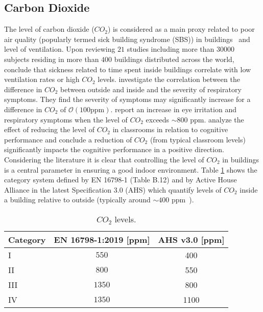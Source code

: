 \documentclass[fleqn,usenatbib,nofootinbib]{revtex4-2}
\begin{document}
	\subsection{Carbon Dioxide}
	The level of carbon dioxide ($CO_2$) is considered as a main proxy related to poor air quality (popularly termed sick building syndrome (SBS)) in buildings~\citep{Bourbeau1997,Backman1999,Seppanen1999,Apte2000a,Apte2000b,Engvall2001,Daisey2003,Seppanen2004,Mendell2005,Haverinen2011,Tsai2012,Lu2015,Petersen2015} and level of ventilation. Upon reviewing $21$ studies including more than $30 000$ subjects residing in more than $400$ buildings distributed across the world, \citet{Seppanen1999} conclude that sickness related to time spent inside buildings correlate with low ventilation rates or high $CO_2$ levels. \citet{Apte2000a} investigate the correlation between the difference in $CO_2$ between outside and inside and the severity of respiratory symptoms. They find the severity of symptoms may significantly increase for a difference in $CO_2$ of $\mathcal{O}(100\text{ppm})$. \citet{Tsai2012} report an increase in eye irritation and respiratory symptoms when the level of $CO_2$ exceeds $\sim 800$ ppm. \citet{Petersen2015} analyze the effect of reducing the level of $CO_2$ in classrooms in relation to cognitive performance and conclude a reduction of $CO_2$ (from typical classroom levels) significantly impacts the cognitive performance in a positive direction. Considering the literature it is clear that controlling the level of $CO_2$ in buildings is a central parameter in ensuring a good indoor environment. Table \ref{tab:1} shows the category system defined by EN 16798-1 (Table B.12) and by Active House Alliance in the latest Specification 3.0 (AHS) which quantify levels of $CO_2$ inside a building relative to outside (typically around $\sim 400$ ppm~\citep{EN16798-1}).
	\begin{table}[h]
		\centering
		\caption{$CO_2$ levels.}
		\label{tab:1}
		\begin{tabular}{lcc}
			\hline
			Category & EN 16798-1:2019 [ppm] & AHS v3.0 [ppm] \\
			\hline
			\hline
			I & $550$ & 400 \\
			II & $800$ & 550 \\
			III & $1350$ & 800 \\
			IV & $1350$ & 1100\\
			\hline
		\end{tabular}
	\end{table}
	
\end{document}
